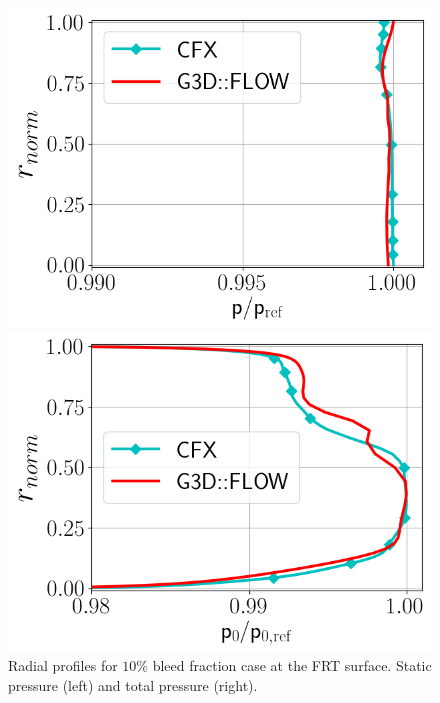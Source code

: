 \begin{figure}[h!]
  \centering
  \begin{minipage}{0.48\columnwidth}
  \includegraphics[width=1.\textwidth]{figures/PAaveB10_FRT.png}
  \end{minipage}
  \begin{minipage}{0.48\columnwidth}
  \includegraphics[width=1.\textwidth]{figures/P0MaveB10_FRT.png}
  \end{minipage}
  \caption{Radial profiles for $10\%$ bleed fraction case at the FRT surface. Static pressure (left) and total pressure (right).} \label{fig:FRT10}
\end{figure}

